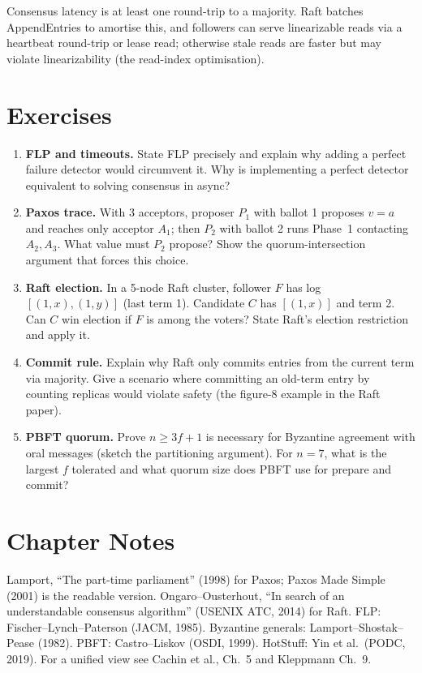 \begin{remark}
Consensus latency is at least one round-trip to a majority. Raft batches AppendEntries to amortise this, and followers can serve linearizable reads via a heartbeat round-trip or lease read; otherwise stale reads are faster but may violate linearizability (the read-index optimisation).
\end{remark}

\section{Exercises}
\label{sec:ch04-exercises}
\begin{enumerate}[label=E4.\arabic*, leftmargin=*, itemsep=0.6em]
    \item \textbf{FLP and timeouts.} State FLP precisely and explain why adding a perfect failure detector would circumvent it. Why is implementing a perfect detector equivalent to solving consensus in async?
    \item \textbf{Paxos trace.} With 3 acceptors, proposer $P_1$ with ballot 1 proposes $v=a$ and reaches only acceptor $A_1$; then $P_2$ with ballot 2 runs Phase~1 contacting $A_2,A_3$. What value must $P_2$ propose? Show the quorum-intersection argument that forces this choice.
    \item \textbf{Raft election.} In a 5-node Raft cluster, follower $F$ has log $[(1,x),(1,y)]$ (last term 1). Candidate $C$ has $[(1,x)]$ and term 2. Can $C$ win election if $F$ is among the voters? State Raft's election restriction and apply it.
    \item \textbf{Commit rule.} Explain why Raft only commits entries from the current term via majority. Give a scenario where committing an old-term entry by counting replicas would violate safety (the figure-8 example in the Raft paper).
    \item \textbf{PBFT quorum.} Prove $n\ge 3f+1$ is necessary for Byzantine agreement with oral messages (sketch the partitioning argument). For $n=7$, what is the largest $f$ tolerated and what quorum size does PBFT use for prepare and commit?
\end{enumerate}

\section*{Chapter Notes}
Lamport, ``The part-time parliament'' (1998) for Paxos; Paxos Made Simple (2001) is the readable version. Ongaro--Ousterhout, ``In search of an understandable consensus algorithm'' (USENIX ATC, 2014) for Raft. FLP: Fischer--Lynch--Paterson (JACM, 1985). Byzantine generals: Lamport--Shostak--Pease (1982). PBFT: Castro--Liskov (OSDI, 1999). HotStuff: Yin et al.\ (PODC, 2019). For a unified view see Cachin et al., Ch.~5 and Kleppmann Ch.~9.


